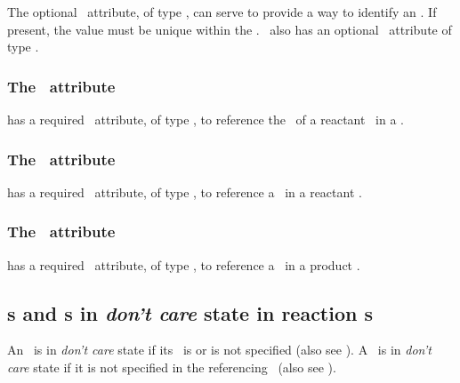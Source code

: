 The optional \idAtt\ attribute, of type \SIdPT, can serve to provide a way to identify an \speciesTypeComponentMapInProduct. If present, the value must be unique within the \reaction. \SpeciesTypeComponentMapInProduct\ also has an optional \nameAtt\ attribute of type \stringPT.

\subsubsection{The \reactantAtt\ attribute}
\label{def:SpeciesTypeComponentMapInProduct:reactant}

 has a required \reactantAtt\ attribute, of type \SIdRefPT, to reference the  \idAtt\ of a reactant \speciesReference\ in a \reaction.

\subsubsection{The \reactantComponentAtt\ attribute}
\label{def:SpeciesTypeComponentMapInProduct:reactantComponent}

 has a required \reactantComponentAtt\ attribute, of type \SIdRefPT, to reference a \componentWR\ in a reactant \species. 

\subsubsection{The \productComponentAtt\ attribute}
\label{def:SpeciesTypeComponentMapInProduct:productComponent}

 has a required \productComponentAtt\ attribute, of type \SIdRefPT, to reference a \componentWR\ in a product \species. 

\clearpage

\subsection{s and \speciesFeature s in \emph{don't care} state in reaction \product s}
\label{def:Reaction:dontcaredontchange}

An \outwardBindingSite\ is in \emph{don't care} state if its \bindingStatusAtt\ is  or is not specified (also see ). A \speciesFeature\ is in \emph{don't care} state if it is not specified in the referencing \species\ (also see ). 

